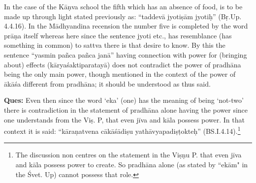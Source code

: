 \textbf{}

\vskip -2pt


\vskip -2pt


\vskip -2pt

In the case of the Kāṇva school the fifth which has an absence of food, is to be made up through light stated previously as: “taddevā jyotiṣām jyotiḥ” (Bṛ.Up. 4.4.16). In the Mādhyandina recension the number five is completed by the word prāṇa itself whereas here since the sentence jyoti etc., has resemblance (has something in common) to sattva there is that desire to know. By this the sentence “yasmin pañca pañca janā” having connection with power for (bringing about) effects (kāryaśaktiparatayā) does not contradict the power of pradhāna being the only main power, though mentioned in the context of the power of ākāśa different from pradhāna; it should be understood as thus said.

\textbf{Ques:} Even then since the word ‘eka’ (one) has the meaning of being ‘not-two’ there is contradiction in the statement of pradhāna alone having the power since one understands from the Viṣ. P, that even jīva and kāla possess power. In that context it is said: “kāraṇatvena cākāśādiṣu yathāvyapadiṣṭokteḥ” (BS.I.4.14).\footnote{The discussion non centres on the statement in the Viṣṇu P. that even jīva and kāla possess power to create. So pradhāna alone (as stated by ``ekām" in the Śvet. Up) cannot possess that role.}

\textbf{}


